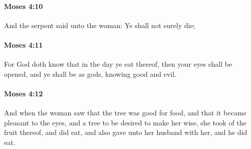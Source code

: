 		\paragraph{Moses 4:10} %
			\label{MOSES-4-10}

			And the serpent said unto the woman: Ye shall not surely die;


		\paragraph{Moses 4:11} %
			\label{MOSES-4-11}

			For God doth know that in the day ye eat thereof, then your eyes shall be opened, and ye shall be as gods, knowing good and evil.


		\paragraph{Moses 4:12} %
			\label{MOSES-4-12}

			And when the woman saw that the tree was good for food, and that it became pleasant to the eyes, and a tree to be desired to make her wise, she took of the fruit thereof, and did eat, and also gave unto her husband with her, and he did eat.


